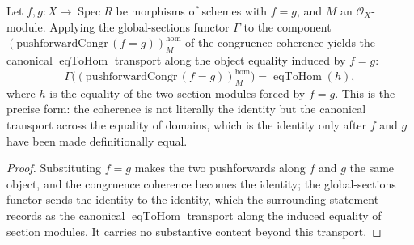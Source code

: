 \begin{lemma}

  \label{lem:gammaMap_pushforwardCongr_hom}
  Let \(f, g : X \to \operatorname{Spec} R\) be morphisms of schemes with \(f = g\), and \(M\)
  an \(\mathcal{O}_X\)-module. Applying the global-sections functor \(\Gamma\) to the component
  \((\mathrm{pushforwardCongr}\,(f = g))^{\mathrm{hom}}_M\) of the congruence coherence yields the
  canonical \(\operatorname{eqToHom}\) transport along the object equality induced by \(f = g\):
  \[
    \Gamma\bigl((\mathrm{pushforwardCongr}\,(f = g))^{\mathrm{hom}}_M\bigr)
      = \operatorname{eqToHom}(h),
  \]
  where \(h\) is the equality of the two section modules forced by \(f = g\). This is the precise
  form: the coherence is not literally the identity but the canonical transport across the equality
  of domains, which is the identity only after \(f\) and \(g\) have been made definitionally equal.
\end{lemma}
\begin{proof}
  Substituting \(f = g\) makes the two pushforwards along \(f\) and \(g\) the same object, and the
  congruence coherence becomes the identity; the global-sections functor sends the identity to the
  identity, which the surrounding statement records as the canonical
  \(\operatorname{eqToHom}\) transport along the induced equality of section modules. It carries no
  substantive content beyond this transport.
\end{proof}



